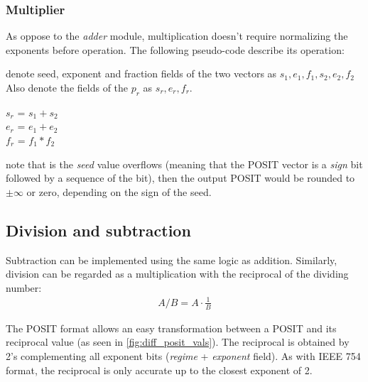 \documentclass[10pt]{article}
\begin{document}

\subsubsection{Multiplier}\label{sec:multiplier}

As oppose to the \textit{adder} module, multiplication doesn't require
normalizing the exponents before operation. The following pseudo-code describe
its operation: \\
\begin{algorithm}[H]
 denote seed, exponent and fraction fields of the two vectors as
 $s_{1}, e_{1}, f_{1}, s_{2}, e_{2}, f_{2}$ \\
 Also denote the fields of the $p_{r}$ as $s_{r}, e_{r}, f_{r}$. \\

  {

   $s_{r}$ = $s_{1} + s_{2}$ \\
   $e_{r}$ = $e_{1} + e_{2}$ \\
   $f_{r}$ = $f_{1} * f_{2}$ \\
    }
  \end{algorithm}

\noindent note that is the \textit{seed} value overflows (meaning that the
POSIT vector is a \textit{sign} bit followed by a sequence of the bit), then the
output POSIT would be rounded to $\pm \infty$ or zero, depending on the sign of
the seed.

\subsection{Division and subtraction}\label{sec:division-subtraction}

Subtraction can be implemented using the same logic as addition. Similarly,
division can be regarded as a multiplication with the reciprocal of the dividing
number:
\begin{align*}
  A/B = A\cdot \frac{1}{B}
\end{align*}

\noindent The POSIT format allows an easy transformation between a POSIT and its
reciprocal value (as seen in \autoref{fig:diff_posit_vals}). The reciprocal is
obtained by 2's complementing all exponent bits (\textit{regime} +
\textit{exponent} field).
As with IEEE 754 format, the reciprocal is only accurate up to the closest
exponent of 2.
\end{document}

